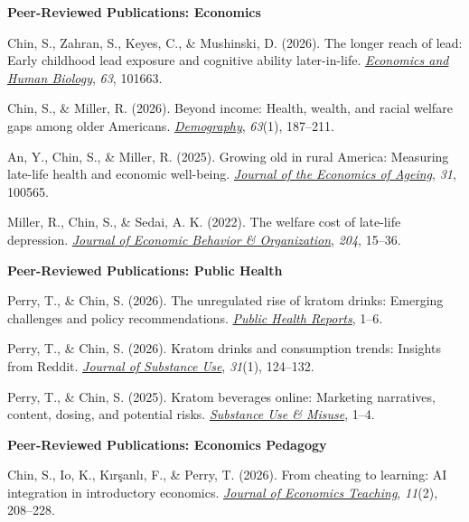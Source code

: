 \documentclass[a4paper,11pt]{article}
\begin{document}
\textbf{Peer-Reviewed Publications: Economics}
\begin{enumerate}[leftmargin=*, label={[\arabic*]}]
\item Chin, S., Zahran, S., Keyes, C., \& Mushinski, D. (2026). The longer reach of lead: Early childhood lead exposure and cognitive ability later-in-life. \href{https://doi.org/10.1016/j.ehb.2026.101663}{\emph{Economics and Human Biology}}, \emph{63}, 101663.
\item Chin, S., \& Miller, R. (2026). Beyond income: Health, wealth, and racial welfare gaps among older Americans. \href{https://doi.org/10.1215/00703370-12460649}{\emph{Demography}}, \emph{63}(1), 187–211.
\item An, Y., Chin, S., \& Miller, R. (2025). Growing old in rural America: Measuring late-life health and economic well-being. \href{https://doi.org/10.1016/j.jeoa.2025.100565}{\emph{Journal of the Economics of Ageing}}, \emph{31}, 100565.
\item Miller, R., Chin, S., \& Sedai, A. K. (2022). The welfare cost of late-life depression. \href{https://doi.org/10.1016/j.jebo.2022.10.001}{\emph{Journal of Economic Behavior \& Organization}}, \emph{204}, 15–36.
\end{enumerate}

\textbf{Peer-Reviewed Publications: Public Health}
\begin{enumerate}[leftmargin=*, label={[\arabic*]}]
\item Perry, T., \& Chin, S. (2026). The unregulated rise of kratom drinks: Emerging challenges and policy recommendations. \href{https://doi.org/10.1177/00333549251403378}{\emph{Public Health Reports}}, 1–6.
\item Perry, T., \& Chin, S. (2026). Kratom drinks and consumption trends: Insights from Reddit. \href{https://doi.org/10.1080/14659891.2025.2481069}{\emph{Journal of Substance Use}}, \emph{31}(1), 124–132.
\item Perry, T., \& Chin, S. (2025). Kratom beverages online: Marketing narratives, content, dosing, and potential risks. \href{https://doi.org/10.1080/10826084.2025.2592879}{\emph{Substance Use \& Misuse}}, 1–4.
\end{enumerate}

\textbf{Peer-Reviewed Publications: Economics Pedagogy}
\begin{enumerate}[leftmargin=*, label={[\arabic*]}]
    \item Chin, S., Io, K., K\i r\c{s}anl\i, F., \& Perry, T. (2026). From cheating to learning: AI integration in introductory economics. \href{https://doi.org/10.58311/jeconteach/9e4dd0ab8f5c89e19fdf8ca2e1a96d370b31a0fe}{\emph{Journal of Economics Teaching}}, \emph{11}(2), 208–228.
\end{enumerate}
\end{document}
